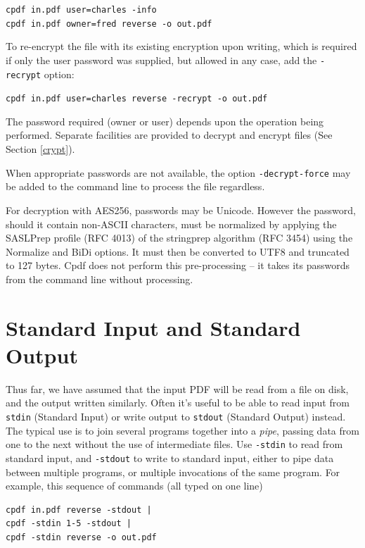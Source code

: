 \documentclass{book}
\begin{document}
\begin{framed}
\noindent\small\verb!cpdf in.pdf user=charles -info!\\
\noindent\small\verb!cpdf in.pdf owner=fred reverse -o out.pdf!
\end{framed}

\noindent To re-encrypt the file with its existing encryption upon writing, which is required if only the user password was supplied, but allowed in any case, add the \texttt{-recrypt} option:

\begin{framed}
\noindent\small\verb!cpdf in.pdf user=charles reverse -recrypt -o out.pdf!
\end{framed}

\noindent The password required (owner or user) depends upon the operation
being performed. Separate facilities are provided to decrypt and encrypt files
(See Section \ref{crypt}).

When appropriate passwords are not available, the option \texttt{-decrypt-force} may be added to the command line to process the file regardless.

For decryption with AES256, passwords may be Unicode. However the password, should it contain non-ASCII characters, must be normalized by applying the SASLPrep profile (RFC 4013) of the stringprep algorithm (RFC 3454) using the Normalize and BiDi options. It must then be converted to UTF8 and truncated to 127 bytes. Cpdf does not perform this pre-processing -- it takes its passwords from the command line without processing.

  \section{Standard Input and Standard Output}
 
  Thus far, we have assumed that the input PDF will be read from a file on
disk, and the output written similarly. Often it's useful to be able to read
input from \texttt{stdin} (Standard Input) or write output to \texttt{stdout}
(Standard Output) instead. The typical use is to join several programs
together into a \textit{pipe}, passing data from one to the next without the
use of intermediate files. Use \texttt{-stdin} to read from standard input, and
\texttt{-stdout} to write to standard input, either to pipe data between
multiple programs, or multiple invocations of the same program. For example, this sequence of commands (all typed on one line)

  \begin{framed}
  \noindent\small\begin{verbatim}cpdf in.pdf reverse -stdout |
cpdf -stdin 1-5 -stdout |
cpdf -stdin reverse -o out.pdf\end{verbatim}
  \end{framed}
\end{document}
